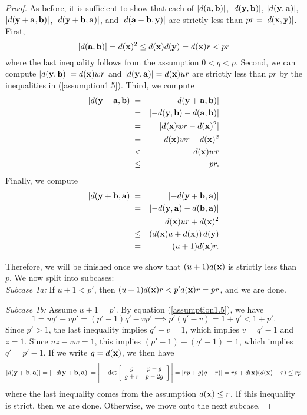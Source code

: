 \begin{proof}
	As before, it is sufficient to show that each of $\lvert d({\mathbf{a}}, {\mathbf{b}}) \rvert$, $\lvert d({\mathbf{y}},{\mathbf{b}}) \rvert$, $\lvert d({\mathbf{y}},{\mathbf{a}}) \rvert$, $\lvert d({\mathbf{y}}+{\mathbf{a}},{\mathbf{b}}) \rvert$, $\lvert d({\mathbf{y}}+{\mathbf{b}},{\mathbf{a}}) \rvert$, and $\lvert d({\mathbf{a}}-{\mathbf{b}},{\mathbf{y}}) \rvert$ are strictly less than $pr  = \lvert d({\mathbf{x}},{\mathbf{y}}) \rvert$. First,
	\[
	\lvert d({\mathbf{a}},{\mathbf{b}}) \rvert = d({\mathbf{x}})^2 \leq d({\mathbf{x}})d({\mathbf{y}}) = d({\mathbf{x}})r < pr
	\]
	where the last inequality follows from the assumption $0 < q < p$. Second, we can compute $\lvert d({\mathbf{y}},{\mathbf{b}}) \rvert = d({\mathbf{x}})w r $ and $ \lvert d({\mathbf{y}},{\mathbf{a}}) \rvert =  d({\mathbf{x}})u r $ are strictly less than $pr$ by the inequalities in (\ref{assumption1.5}). Third, we compute
	\begin{eqnarray*}
		\lvert d(\yy+\aab, \bb) \rvert &=& \lvert -d(\yy+\aab, \bb) \rvert \\
		&=& \lvert -d(\yy,\bb) - d(\aab, \bb) \rvert\\
		&=& \lvert d(\xx)wr - d(\xx)^2 \rvert \\
		&=& d(\xx)wr - d(\xx)^2 \\ %
		&<& d(\xx)wr\\
		&\leq& pr.
	\end{eqnarray*}
	Finally, we compute
	\begin{eqnarray*}
		\lvert d({\mathbf{y}}+{\mathbf{b}}, {\mathbf{a}}) \rvert &=& \lvert -d({\mathbf{y}}+{\mathbf{b}}, {\mathbf{a}}) \rvert \\
		&=& \lvert -d({\mathbf{y}},{\mathbf{a}}) - d({\mathbf{b}}, {\mathbf{a}}) \rvert \\
		&=& d({\mathbf{x}})ur + d({\mathbf{x}})^2 \\
		&\leq& \left(d({\mathbf{x}})u + d({\mathbf{x}})\right)d({\mathbf{y}})\\
		&=& (u+1)d({\mathbf{x}})r.
	\end{eqnarray*}
	
	Therefore, we will be finished once we show that $(u+1)d({\mathbf{x}})$ is strictly less than $p$. We now split into subcases:\\[2mm]
	
	\noindent\emph{Subcase 1a:} If $u + 1 < p'$, then $(u+1)d({\mathbf{x}})r < p'd({\mathbf{x}})r = pr$, and we are done. 
	
	\noindent \emph{Subcase 1b:} Assume $u + 1 = p'$. By equation (\ref{assumption1.5}), we have 
	\[
	1 = uq' - vp' = (p'-1)q' - vp'  \implies p'(q'-v) = 1 + q' < 1 + p'.
	\]
	Since $p' > 1$, the last inequality implies $q' - v = 1$, which implies $v = q'-1$ and $z = 1$. Since $uz-vw = 1$, this implies $(p'-1)-(q'-1) = 1$, which implies $q' = p'-1$. If we write $g = d({\mathbf{x}})$, we then have
	\[
	\lvert d({\mathbf{y}} + {\mathbf{b}}, {\mathbf{a}}) \rvert = \lvert -d({\mathbf{y}} + {\mathbf{b}}, {\mathbf{a}}) \rvert = \Bigg| -\det\left[ \begin{array}{cc}g&p -g\\g + r&p-2g\end{array}\right] \Bigg| =  \lvert rp + g(g-r) \rvert = rp + d({\mathbf{x}})(d({\mathbf{x}})-r) \leq rp
	\]
	where the last inequality comes from the assumption $d({\mathbf{x}}) \leq r$. If this inequality is strict, then we are done. Otherwise, we move onto the next subcase.
	

\end{proof}
